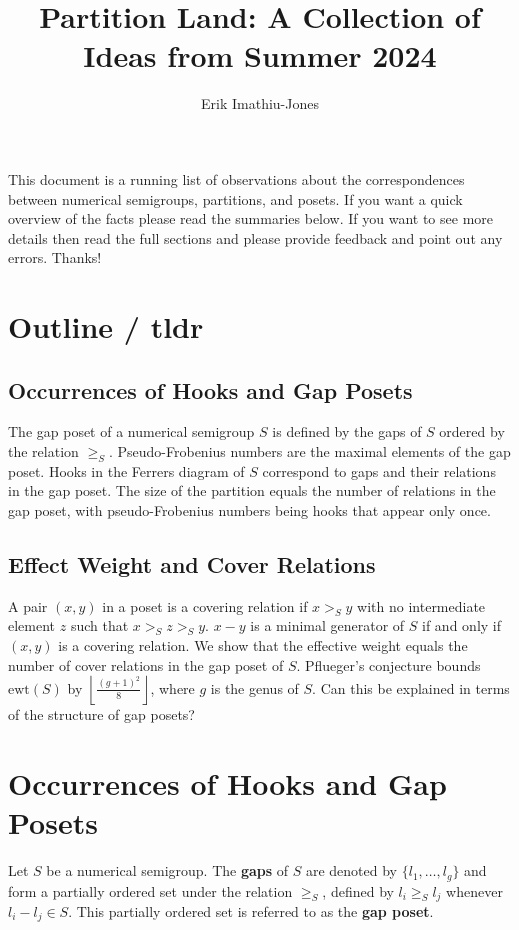 \documentclass[11pt]{article}
\title{Partition Land: A Collection of Ideas from Summer 2024}
\author{Erik Imathiu-Jones}
\newcommand{\term}[1]{\textbf{#1}}
\begin{document}
This document is a running list of observations about the correspondences between numerical semigroups, partitions, and posets. If you want a quick overview of the facts please read the summaries below. If you want to see more details then read the full sections and please provide feedback and point out any errors. Thanks!
\tableofcontents
\section{Outline / tldr}

\subsection{Occurrences of Hooks and Gap Posets}
The gap poset of a numerical semigroup \( S \) is defined by the gaps of \( S \) ordered by the relation \( \ge_S \). Pseudo-Frobenius numbers are the maximal elements of the gap poset. Hooks in the Ferrers diagram of \( S \) correspond to gaps and their relations in the gap poset. The size of the partition equals the number of relations in the gap poset, with pseudo-Frobenius numbers being hooks that appear only once.

\subsection{Effect Weight and Cover Relations}
A pair \((x, y)\) in a poset is a covering relation if \( x >_S y \) with no intermediate element \( z \) such that \( x >_S z >_S y \). \( x - y \) is a minimal generator of \( S \) if and only if \((x, y)\) is a covering relation. We show that the effective weight equals the number of cover relations in the gap poset of \( S \). Pflueger's conjecture bounds \(\text{ewt}(S)\) by \(\left\lfloor \frac{(g + 1)^2}{8} \right\rfloor\), where \( g \) is the genus of \( S \). Can this be explained in terms of the structure of gap posets?


\newpage
\section{Occurrences of Hooks and Gap Posets}

\begin{definition}
Let \( S \) be a numerical semigroup. The \term{gaps} of \( S \) are denoted by \(\{l_1, \dots, l_g\}\) and form a partially ordered set under the relation \( \ge_S \), defined by \( l_i \ge_S l_j \) whenever \( l_i - l_j \in S \). This partially ordered set is referred to as the \term{gap poset}.
\end{definition}
\end{document}
